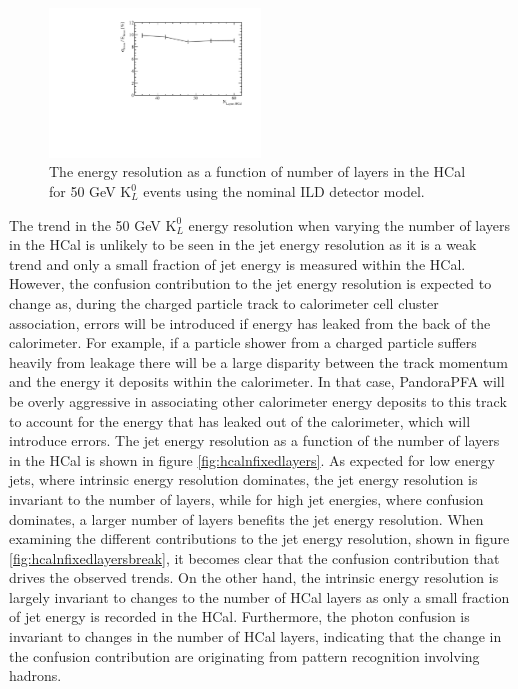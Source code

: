 \begin{figure}[h!]
\centering
\includegraphics[width=0.5\textwidth]{OptimisationStudies/Plots/EnergyResolution/ER_vs_HCalNFixedLayers_50GeVKaon0L.pdf}
\caption[The energy resolution as a function of number of layers in the HCal for 50 GeV $\text{K}^{0}_{L}$ events using the nominal ILD detector model.]{The energy resolution as a function of number of layers in the HCal for 50 GeV $\text{K}^{0}_{L}$ events using the nominal ILD detector model.}
\label{fig:hcalnfixedlayerser}
\end{figure}

The trend in the 50 GeV $\text{K}^{0}_{L}$ energy resolution when varying the number of layers in the HCal is unlikely to be seen in the jet energy resolution as it is a weak trend and only a small fraction of jet energy is measured within the HCal.  However, the confusion contribution to the jet energy resolution is expected to change as, during the charged particle track to calorimeter cell cluster association, errors will be introduced if energy has leaked from the back of the calorimeter.  For example, if a particle shower from a charged particle suffers heavily from leakage there will be a large disparity between the track momentum and the energy it deposits within the calorimeter.  In that case, PandoraPFA will be overly aggressive in associating other calorimeter energy deposits to this track to account for the energy that has leaked out of the calorimeter, which will introduce errors.  The jet energy resolution as a function of the number of layers in the HCal is shown in figure \ref{fig:hcalnfixedlayers}.  As expected for low energy jets, where intrinsic energy resolution dominates, the jet energy resolution is invariant to the number of layers, while for high jet energies, where confusion dominates, a larger number of layers benefits the jet energy resolution.  When examining the different contributions to the jet energy resolution, shown in figure \ref{fig:hcalnfixedlayersbreak}, it becomes clear that the confusion contribution that drives the observed trends.  On the other hand, the intrinsic energy resolution is largely invariant to changes to the number of HCal layers as only a small fraction of jet energy is recorded in the HCal.  Furthermore, the photon confusion is invariant to changes in the number of HCal layers, indicating that the change in the confusion contribution are originating from pattern recognition involving hadrons.

